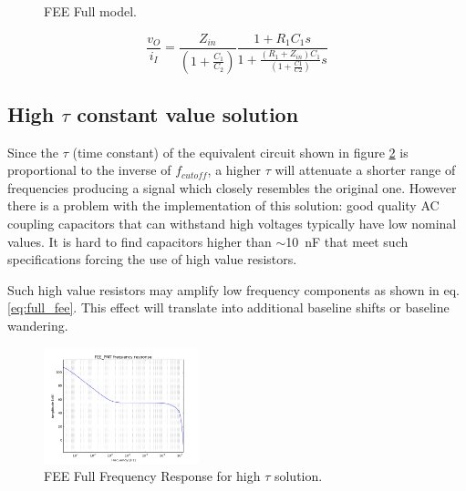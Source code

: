 \documentclass[a4paper, 10pt, oneside, twocolumn, 3p]{elsarticle}
\begin{document}
\begin{figure}[!tbp]
	\centering
	\hfill
	\caption{FEE Full model.}
	\label{fig:FEE_PMT}
\end{figure}

\begin{equation}
\frac{v_O}{i_I} = \frac{Z_{in}}{(1+\frac{C_1}{C_2})}\frac{1+R_1C_1s}{1+\frac{(R_1+Z_{in})C_1}{(1+\frac{C1}{C2})}s} 
\label{eq:full_fee}
\end{equation}


\subsection {High $\tau$ constant value solution}

Since the $\tau$ (time constant) of the equivalent circuit shown in figure \ref{fig:Full_Freq_high_tau} is proportional to the inverse of $f_{cutoff}$, a higher $\tau$ will attenuate a shorter range of frequencies producing a signal which closely resembles the original one. However there is a problem with the implementation of this solution: good quality AC coupling capacitors that can withstand high voltages typically have low nominal values. It is hard to find capacitors higher than $\sim$10~nF that meet such specifications forcing the use of high value resistors. 

Such high value resistors may amplify low frequency components as shown in eq. \ref{eq:full_fee}. This effect will translate into additional baseline shifts or baseline wandering. 

\begin{figure}
	\begin{center}
		\includegraphics[width=0.4\textwidth]{./figures/tau_badidea.png}
		\caption{FEE Full Frequency Response for high $\tau$ solution.}
		\label{fig:Full_Freq_high_tau}
	\end{center}
\end{figure}
\end{document}
